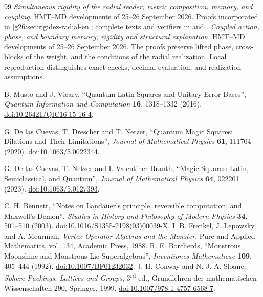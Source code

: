 \begin{thebibliography}{99}
 \emph{Simultaneous rigidity of the radial reader;
metric composition, memory, and coupling}. HMT--MD developments of
25--26 September 2026. Proofs incorporated in
\ref{g26:sec:rigidez-radial-en}; complete texts and verifiers in
 and
.
 \emph{Coupled action, phase, and boundary memory;
rigidity and structural explanation}. HMT--MD developments of
25--26 September 2026. The proofs preserve lifted phase, cross-blocks
of the weight, and the conditions of the radial realization. Local
reproduction distinguishes exact checks, decimal evaluation, and
realization assumptions.
{}
 B. Musto and J. Vicary, ``Quantum Latin Squares and Unitary Error Bases'', \emph{Quantum Information and Computation} \textbf{16}, 1318--1332 (2016). \href{https://doi.org/10.26421/QIC16.15-16-4}{doi:10.26421/QIC16.15-16-4}.


 G. De las Cuevas, T. Drescher and T. Netzer, ``Quantum Magic Squares: Dilations and Their Limitations'', \emph{Journal of Mathematical Physics} \textbf{61}, 111704 (2020). \href{https://doi.org/10.1063/5.0022344}{doi:10.1063/5.0022344}.


 G. De las Cuevas, T. Netzer and I. Valentiner-Branth, ``Magic Squares: Latin, Semiclassical, and Quantum'', \emph{Journal of Mathematical Physics} \textbf{64}, 022201 (2023). \href{https://doi.org/10.1063/5.0127393}{doi:10.1063/5.0127393}.


 C. H. Bennett, ``Notes on Landauer's principle,
reversible computation, and Maxwell's Demon'', \emph{Studies in History
and Philosophy of Modern Physics} \textbf{34}, 501--510 (2003).
\href{https://doi.org/10.1016/S1355-2198(03)00039-X}{doi:10.1016/S1355-2198(03)00039-X}.
 I. B. Frenkel, J. Lepowsky and A. Meurman, \emph{Vertex Operator Algebras and the Monster}, Pure and Applied Mathematics, vol. 134, Academic Press, 1988.
 R. E. Borcherds, ``Monstrous Moonshine and Monstrous Lie Superalgebras'', \emph{Inventiones Mathematicae} \textbf{109}, 405--444 (1992). \href{https://doi.org/10.1007/BF01232032}{doi:10.1007/BF01232032}.
 J. H. Conway and N. J. A. Sloane, \emph{Sphere Packings, Lattices and Groups}, 3\textsuperscript{rd} ed., Grundlehren der mathematischen Wissenschaften 290, Springer, 1999. \href{https://doi.org/10.1007/978-1-4757-6568-7}{doi:10.1007/978-1-4757-6568-7}.


\end{thebibliography}
